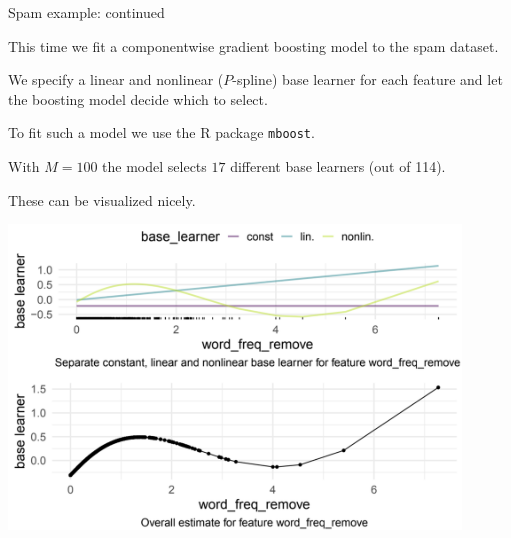 \begin{vbframe}{Spam example: continued}

This time we fit a componentwise gradient boosting model to the spam dataset.

\lz

We specify a linear and nonlinear ($P$-spline) base learner for each feature and let the boosting model decide which to select.


\lz

To fit such a model we use the R package \texttt{mboost}.



\lz

With $M = 100$ the model selects $17$ different base learners (out of 114).

\lz

These can be visualized nicely.

\framebreak

\vspace{0.3cm}

\begin{center}
\includegraphics[width=0.9\textwidth]{figure_man/spam-example.png}
\end{center}

\end{vbframe}

